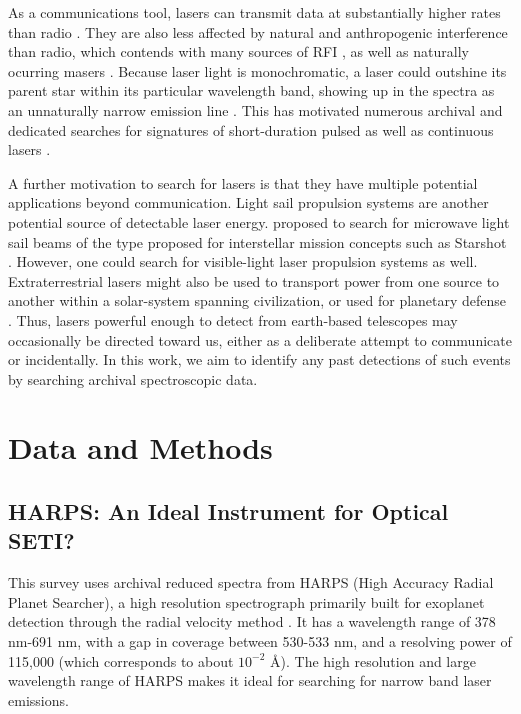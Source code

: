 \documentclass[linenumbers]{aastex631}
\begin{document}
As a communications tool, lasers can transmit data at substantially higher rates than radio \citep{Tellis_2017,Kingsley}. They are also less affected by natural and anthropogenic interference than radio, which contends with many sources of RFI \citep{RFIpaper}, as well as naturally ocurring masers \citep{mendez2024arecibowowiastrophysical}. Because laser light is monochromatic, a laser could outshine its parent star within its particular wavelength band, showing up in the spectra as an unnaturally narrow emission line \citep{TOWNES_SCHWARTZ_1961,STANTON201992}. This has motivated numerous archival and dedicated searches for signatures of short-duration pulsed as well as continuous lasers \citep{Tellis_2017,Lipman_2019,Howard_2004,Shelley_Wright,Zuckerman_2023,Reines_2002,Maire_2019,Marcy_2021}.

A further motivation to search for lasers is that they have multiple potential applications beyond communication. Light sail propulsion systems are another potential source of detectable laser energy. \cite{Guillochon_2015} proposed to search for microwave light sail beams of the type proposed for interstellar mission concepts such as Starshot \citep{STARSHOT}. However, one could search for visible-light laser propulsion systems as well. Extraterrestrial lasers might also be used to transport power from one source to another within a solar-system spanning civilization, or used for planetary defense \citep{Bible_Johansson_Hughes_Lubin_2013}. Thus, lasers powerful enough to detect from earth-based telescopes may occasionally be directed toward us, either as a deliberate attempt to communicate or incidentally. In this work, we aim to identify any past detections of such events by searching archival spectroscopic data.

\section{Data and Methods}
\subsection{HARPS: An Ideal Instrument for Optical SETI?}
This survey uses archival reduced spectra from HARPS (High Accuracy Radial Planet Searcher), a high resolution spectrograph primarily built for exoplanet detection through the radial velocity method \citep{HARPS_specs}. It has a wavelength range of 378 nm-691 nm, with a gap in coverage between 530-533 nm, and a resolving power of 115,000 \citep{HARPS_specs} (which corresponds to about $10^{-2}$ \AA). The high resolution and large wavelength range of HARPS makes it ideal for searching for narrow band laser emissions. 
\end{document}
